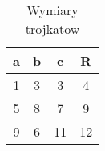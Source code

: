 \begin{table}[htbp]
\centering
\begin{tabular}{||c c c c||} 
 \hline
 a & b & c & R \\ [0.5ex] 
 \hline\hline
 1 & 3 & 3 & 4 \\ 
 \hline
 5 & 8 & 7 & 9 \\
 \hline
 9 & 6 & 11 & 12 \\
 \hline
\end{tabular}
\label{tab:2}
\caption{Wymiary trojkatow}
\end{table}
